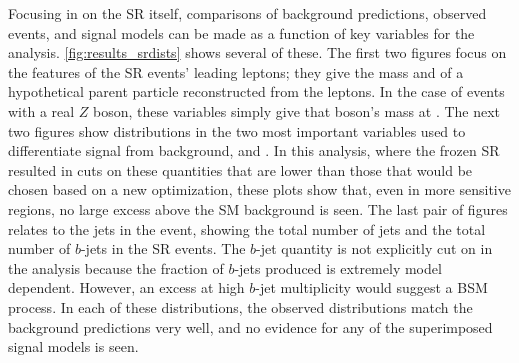 Focusing in on the \ac{SR} itself, comparisons of background predictions, observed events, and signal models can be made as a function of key variables for the analysis. \autoref{fig:results_srdists} shows several of these. The first two figures focus on the features of the \ac{SR} events' leading leptons; they give the mass and \pt of a hypothetical parent particle reconstructed from the leptons. In the case of events with a real $Z$ boson, these variables simply give that boson's mass at \pt. The next two figures show distributions in the two most important variables used to differentiate signal from background, \met and \HT. In this analysis, where the frozen \ac{SR} resulted in cuts on these quantities that are lower than those that would be chosen based on a new optimization, these plots show that, even in more sensitive regions, no large excess above the \ac{SM} background is seen. The last pair of figures relates to the jets in the event, showing the total number of jets and the total number of $b$-jets in the \ac{SR} events. The $b$-jet quantity is not explicitly cut on in the analysis because the fraction of $b$-jets produced is extremely model dependent. However, an excess at high $b$-jet multiplicity would suggest a \ac{BSM} process. In each of these distributions, the observed distributions match the background predictions very well, and no evidence for any of the superimposed signal models is seen. 

